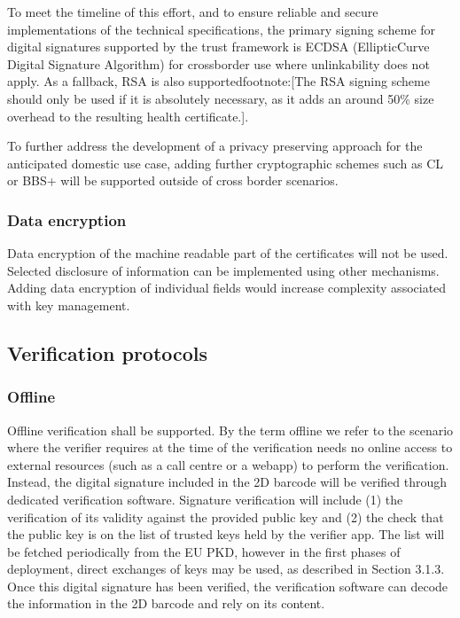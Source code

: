 \documentclass[a4paper,12pt,english]{sphinxhowto}
\begin{document}
\sphinxAtStartPar
To meet the timeline of this effort, and to ensure reliable and secure implementations of the technical specifications, the primary signing scheme for digital signatures supported by the trust framework is EC\sphinxhyphen{}DSA (Elliptic\sphinxhyphen{}Curve Digital Signature Algorithm) for cross\sphinxhyphen{}border use where unlinkability does not apply. As a fallback, RSA is also supportedfootnote:{[}The RSA signing scheme should only be used if it is absolutely necessary, as it adds an around 50\% size overhead to the resulting health certificate.{]}.

\sphinxAtStartPar
To further address the development of a privacy preserving approach for the anticipated domestic use case, adding further cryptographic schemes such as CL or BBS+ will be supported outside of cross border scenarios.


\subsubsection{Data encryption}
\label{\detokenize{ssi/annotehealth:data-encryption}}
\sphinxAtStartPar
Data encryption of the machine readable part of the certificates will not be used. Selected disclosure of information can be implemented using other mechanisms. Adding data encryption of individual fields would increase complexity associated with key management.


\subsection{Verification protocols}
\label{\detokenize{ssi/annotehealth:verification-protocols}}

\subsubsection{Offline}
\label{\detokenize{ssi/annotehealth:offline}}
\sphinxAtStartPar
Offline verification shall be supported. By the term offline we refer to the scenario where the verifier requires at the time of the verification needs no online access to external resources (such as a call centre or a webapp) to perform the verification. Instead, the digital signature included in the 2D barcode will be verified through dedicated verification software. Signature verification will include (1) the verification of its validity against the provided public key and (2) the check that the public key is on the list of trusted keys held by the verifier app. The list will be fetched periodically from the EU PKD, however in the first phases of deployment, direct exchanges of keys may be used, as described in Section 3.1.3. Once this digital signature has been verified, the verification software can decode the information in the 2D barcode and rely on its content.
\end{document}
